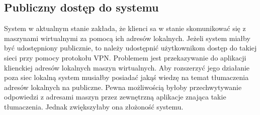 \documentclass[../podsumowanie.tex]{subfiles}
\begin{document}
\subsection{Publiczny dostęp do systemu}

System w aktualnym stanie zakłada, że klienci sa w stanie skomunikować się z maszynami wirtualnymi za pomocą ich adresów lokalnych.
Jeżeli system miałby być udostępniony publicznie, to należy udostępnić użytkownikom dostęp do takiej sieci przy pomocy protokołu VPN.
Problemem jest przekazywanie do aplikacji klienckiej adresów lokalnych maszyn wirtualnych.
Aby rozszerzyć jego działanie poza siec lokalną  system musiałby posiadać jakąś wiedzę na temat tłumaczenia adresów lokalnych na publiczne.
Pewna możliwością byłoby przechwytywanie odpowiedzi z adresami maszyn przez zewnętrzną aplikacje znająca takie tłumaczenia.
Jednak zwiększyłaby ona złożoność systemu.
\end{document}
